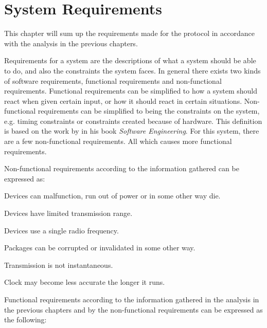 \chapter{System Requirements}\label{requirements}
This chapter will sum up the requirements made for the protocol in accordance with the analysis in the previous chapters.

Requirements for a system are the descriptions of what a system should be able to do, and also the constraints the system faces.
In general there exists two kinds of software requirements, functional requirements and non-functional requirements. 
Functional requirements can be simplified to how a system should react when given certain input, or how it should react in certain situations.
Non-functional requirements can be simplified to being the constraints on the system, e.g. timing constraints or constraints created because of hardware.
This definition is based on the work by \citet[see][chapter 4]{SEBook} in his book \textit{Software Engineering}.
For this system, there are a few non-functional requirements. All which causes more functional requirements.

\bigskip \noindent
Non-functional requirements according to the information gathered can be expressed as:
\begin{enumberate}
    \item Devices can malfunction, run out of power or in some other way die.
    \item Devices have limited transmission range.
    \item Devices use a single radio frequency.
    \item Packages can be corrupted or invalidated in some other way.
    \item Transmission is not instantaneous.
    \item Clock may become less accurate the longer it runs.
\end{enumberate}

\noindent
Functional requirements according to the information gathered in the analysis in the previous chapters and by the non-functional requirements can be expressed as the following: 

